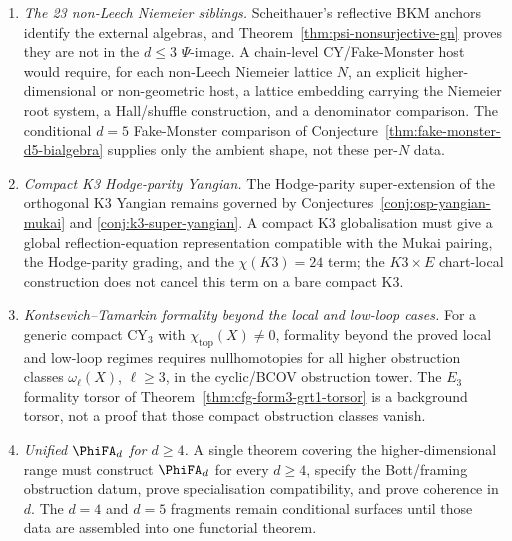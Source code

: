 \begin{theorem}
\begin{enumerate}[label=\textup{(F\arabic*)}]
 the non-simply-laced 5d hCS lane is decided only by one of two
 chain-level outputs: either a nonzero obstruction class in the
 relevant graph/Hochschild complex proving genuine failure, or an
 explicit $\GRT_1$-twisted Drinfeld cocycle, with homotopy, killing
 that class. Conditional twist statements such as
 Theorem~\ref{thm:Yfg-resurgent-Drinfeld-twist-non-simply-laced} and
 Conjecture~\ref{conj:zte-drinfeld-twist-completion} do not choose
 between these alternatives.
 \item \emph{The 23 non-Leech Niemeier siblings.} Scheithauer's
 reflective BKM anchors identify the external algebras, and
 Theorem~\ref{thm:psi-nonsurjective-gn} proves they are not in the
 $d\leq3$ $\Psi$-image. A chain-level CY/Fake-Monster host would
 require, for each non-Leech Niemeier lattice $N$, an explicit
 higher-dimensional or non-geometric host, a lattice embedding carrying
 the Niemeier root system, a Hall/shuffle construction, and a
 denominator comparison. The conditional $d=5$ Fake-Monster comparison
 of Conjecture~\ref{thm:fake-monster-d5-bialgebra} supplies only the
 ambient shape, not these per-$N$ data.
 \item \emph{Compact K3 Hodge-parity Yangian.} The Hodge-parity
 super-extension of the orthogonal K3 Yangian remains governed by
 Conjectures~\ref{conj:osp-yangian-mukai} and
 \ref{conj:k3-super-yangian}. A compact K3 globalisation must give a
 global reflection-equation representation compatible with the Mukai
 pairing, the Hodge-parity grading, and the $\chi(K3)=24$ term; the
 $K3\times E$ chart-local construction does not cancel this term on a
 bare compact K3.
 \item \emph{Kontsevich--Tamarkin formality beyond the local and
 low-loop cases.} For a generic compact CY$_3$ with
 $\chi_{\mathrm{top}}(X)\ne0$, formality beyond the proved local and
 low-loop regimes requires nullhomotopies for all higher obstruction
 classes $\omega_\ell(X)$, $\ell\geq3$, in the cyclic/BCOV
 obstruction tower. The $E_3$ formality torsor of
 Theorem~\ref{thm:cfg-form3-grt1-torsor} is a background torsor, not
 a proof that those compact obstruction classes vanish.
 \item \emph{Unified $\PhiFA_d$ for $d\geq4$.} A single theorem
 covering the higher-dimensional range must construct
 $\PhiFA_d$ for every $d\geq4$, specify the Bott/framing obstruction
 datum, prove specialisation compatibility, and prove coherence in
 $d$. The $d=4$ and $d=5$ fragments remain conditional surfaces
 until those data are assembled into one functorial theorem.

\end{enumerate}
\end{theorem}
